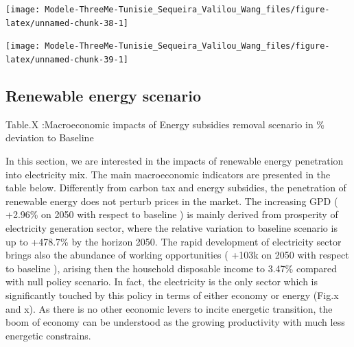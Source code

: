 \documentclass[
]{article}
\begin{document}
\begin{center}\texttt{[image: Modele-ThreeMe-Tunisie\_Sequeira\_Valilou\_Wang\_files/figure-latex/unnamed-chunk-38-1]} \end{center}

\begin{center}\texttt{[image: Modele-ThreeMe-Tunisie\_Sequeira\_Valilou\_Wang\_files/figure-latex/unnamed-chunk-39-1]} \end{center}

\hypertarget{renewable-energy-scenario-1}{%
\subsection{Renewable energy
scenario}\label{renewable-energy-scenario-1}}

Table.X :Macroeconomic impacts of Energy subsidies removal scenario in
\% deviation to Baseline

In this section, we are interested in the impacts of renewable energy
penetration into electricity mix. The main macroeconomic indicators are
presented in the table below. Differently from carbon tax and energy
subsidies, the penetration of renewable energy does not perturb prices
in the market. The increasing GPD ( +2.96\% on 2050 with respect to
baseline ) is mainly derived from prosperity of electricity generation
sector, where the relative variation to baseline scenario is up to
+478.7\% by the horizon 2050. The rapid development of electricity
sector brings also the abundance of working opportunities ( +103k on
2050 with respect to baseline ), arising then the household disposable
income to 3.47\% compared with null policy scenario. In fact, the
electricity is the only sector which is significantly touched by this
policy in terms of either economy or energy (Fig.x and x). As there is
no other economic levers to incite energetic transition, the boom of
economy can be understood as the growing productivity with much less
energetic constrains.
\end{document}
